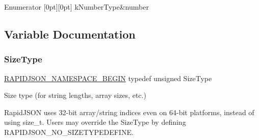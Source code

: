 \begin{DoxyEnumFields}{Enumerator}
[0pt][0pt]{}\mbox{\label{a00560_a1d1cfd8ffb84e947f82999c682b666a7afc9f813b7aaf71911bdae20a86b2702d}} 
k\+Number\+Type&number \\
\hline

\end{DoxyEnumFields}


\subsection{Variable Documentation}
\mbox{\label{a00560_a5ed6e6e67250fadbd041127e6386dcb5}} 
\subsubsection{\texorpdfstring{Size\+Type}{SizeType}}
{\footnotesize\ttfamily \hyperlink{a00636_gad3806c8251fdc7da9618b7e922674ffc}{R\+A\+P\+I\+D\+J\+S\+O\+N\+\_\+\+N\+A\+M\+E\+S\+P\+A\+C\+E\+\_\+\+B\+E\+G\+IN} typedef unsigned Size\+Type}



Size type (for string lengths, array sizes, etc.) 

Rapid\+J\+S\+ON uses 32-\/bit array/string indices even on 64-\/bit platforms, instead of using {\ttfamily size\+\_\+t}. Users may override the Size\+Type by defining R\+A\+P\+I\+D\+J\+S\+O\+N\+\_\+\+N\+O\+\_\+\+S\+I\+Z\+E\+T\+Y\+P\+E\+D\+E\+F\+I\+NE. 
